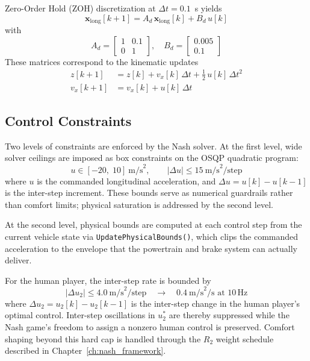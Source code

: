\documentclass[12pt,a4paper,oneside]{report}
\begin{document}
Zero-Order Hold (ZOH) discretization at $\Delta t = 0.1$~s yields
\begin{equation}
\mathbf{x}_{\text{long}}[k+1] = A_d\,\mathbf{x}_{\text{long}}[k] + B_d\,u[k]
\label{eq:long_discrete}
\end{equation}
with
\begin{equation}
A_d = \begin{bmatrix} 1 & 0.1 \\ 0 & 1 \end{bmatrix}, \quad
B_d = \begin{bmatrix} 0.005 \\ 0.1 \end{bmatrix}
\label{eq:Ad_Bd_10Hz}
\end{equation}
These matrices correspond to the kinematic updates
\begin{align}
z[k+1]   &= z[k] + v_x[k]\,\Delta t + \tfrac{1}{2}\,u[k]\,\Delta t^2
\label{eq:pos_update} \\
v_x[k+1] &= v_x[k] + u[k]\,\Delta t
\label{eq:vel_update}
\end{align}

\subsection{Control Constraints}
\label{sec:long_constraints}

Two levels of constraints are enforced by the Nash solver. At the first level, wide solver
ceilings are imposed as box constraints on the OSQP quadratic program:
\begin{equation}
u \in [-20,\; 10]\ \text{m/s}^2, \qquad
|\Delta u| \leq 15\ \text{m/s}^2\text{/step}
\label{eq:long_solver_box}
\end{equation}
where $u$ is the commanded longitudinal acceleration, and $\Delta u = u[k] - u[k-1]$ is
the inter-step increment. These bounds serve as numerical guardrails rather than comfort
limits; physical saturation is addressed by the second level.

At the second level, physical bounds are computed at each control step from the
current vehicle state via \texttt{UpdatePhysicalBounds()}, which clips the commanded
acceleration to the envelope that the powertrain and brake system can actually deliver.

For the human player, the inter-step rate is bounded by
\begin{equation}
|\Delta u_2| \leq 4.0\ \text{m/s}^2\text{/step}
\quad \longrightarrow \quad
0.4\ \text{m/s}^2\text{/s at } 10\,\text{Hz}
\label{eq:long_human_jerk}
\end{equation}
where $\Delta u_2 = u_2[k] - u_2[k-1]$ is the inter-step change in the human player's
optimal control. Inter-step oscillations in $u_2^*$ are thereby suppressed while the
Nash game's freedom to assign a nonzero human control is preserved. Comfort shaping beyond
this hard cap is handled through the $R_2$ weight schedule described in
Chapter~\ref{ch:nash_framework}.
\end{document}
